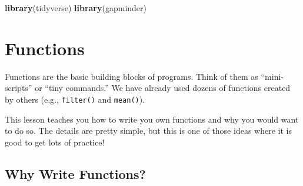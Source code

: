 \documentclass[]{book}
\newenvironment{Shaded}{\begin{snugshade}}{\end{snugshade}}
\newcommand{\KeywordTok}[1]{\textcolor[rgb]{0.13,0.29,0.53}{\textbf{#1}}}
\newcommand{\DataTypeTok}[1]{\textcolor[rgb]{0.13,0.29,0.53}{#1}}
\newcommand{\DecValTok}[1]{\textcolor[rgb]{0.00,0.00,0.81}{#1}}
\newcommand{\StringTok}[1]{\textcolor[rgb]{0.31,0.60,0.02}{#1}}
\newcommand{\CommentTok}[1]{\textcolor[rgb]{0.56,0.35,0.01}{\textit{#1}}}
\newcommand{\OperatorTok}[1]{\textcolor[rgb]{0.81,0.36,0.00}{\textbf{#1}}}
\newcommand{\NormalTok}[1]{#1}
\begin{document}
\begin{Shaded}
\end{Shaded}

\begin{Shaded}
\begin{Highlighting}[]
\KeywordTok{library}\NormalTok{(tidyverse)}
\KeywordTok{library}\NormalTok{(gapminder)}
\end{Highlighting}
\end{Shaded}

\hypertarget{functions-1}{\section{Functions}\label{functions-1}}

Functions are the basic building blocks of programs. Think of them as
``mini-scripts'' or ``tiny commands.'' We have already used dozens of
functions created by others (e.g., \texttt{filter()} and
\texttt{mean()}).

This lesson teaches you how to write you own functions and why you would
want to do so. The details are pretty simple, but this is one of those
ideas where it is good to get lots of practice!

\subsection{Why Write Functions?}\label{why-write-functions}
\end{document}
